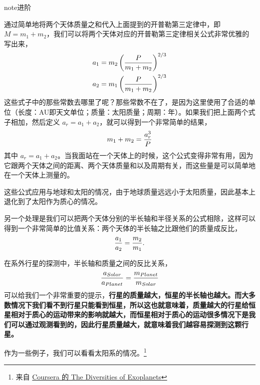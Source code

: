\documentclass[letterpaper,10pt,english]{sphinxmanual}
\begin{document}
\begin{notice}{note}{进阶}

通过简单地将两个天体质量之和代入上面提到的开普勒第三定律中，即 \(M=m_1+m_2\)，我们可以将两个天体对应的开普勒第三定律相关公式非常优雅的写出来，
\begin{gather}
\begin{split}a_1 & = m_2 \left( \frac{P}{m_1+m_2} \right)^{2/3} \\
a_2 & = m_1 \left( \frac{P}{m_1+m_2} \right)^{2/3}\end{split}\notag
\end{gather}
这些式子中的那些常数去哪里了呢？那些常数不在了，是因为这里使用了合适的单位（长度：AU即天文单位；质量：太阳质量；周期：年）。如果我们把上面两个式子相加，然后定义 \(a_r=a_1+a_2\)，就可以得到一个非常简单的结果，
\begin{gather}
\begin{split}m_1+m_2 = \frac{a^3_r}{P}\end{split}\notag
\end{gather}
其中 \(a_r=a_1+a_2\)。当我面站在一个天体上的时候，这个公式变得非常有用，因为它跟两个天体之间的距离、两个天体质量和以及周期有关，而这些量是可以简单地在一个天体上测量的。

这些公式应用与地球和太阳的情况，由于地球质量远远小于太阳质量，因此基本上退化到了太阳作为质心的情况。

另一个处理是我们可以把两个天体分别的半长轴和半径关系的公式相除，这样可以得到一个非常简单的比值关系：两个天体的半长轴之比跟他们的质量成反比，
\begin{gather}
\begin{split}\frac{a_1}{a_2} = \frac{m_2}{m_1}.\end{split}\notag
\end{gather}\end{notice}

在系外行星的探测中，半长轴和质量之间的反比关系，
\begin{gather}
\begin{split}\frac{a_{Solar}}{a_{Planet}} = \frac{m_{Planet}}{m_{Solar}}\end{split}\notag
\end{gather}
可以给我们一个非常重要的提示，\textbf{行星的质量越大，恒星的半长轴也越大。而大多数情况下我们看不到行星只能看到恒星，所以这也就意味着，质量越大的行星给恒星相对于质心的运动带来的影响就越大，而恒星相对于质心的运动很多情况下是我们可以通过观测看到的，因此行星质量越大，就意味着我们越容易探测到这颗行星。}

作为一些例子，我们可以看看太阳系的情况。\footnote{
来自 \href{https://class.coursera.org/extrasolarplanets-001}{Coursera 的 The Diversities of Exoplanets}
}
\end{document}
